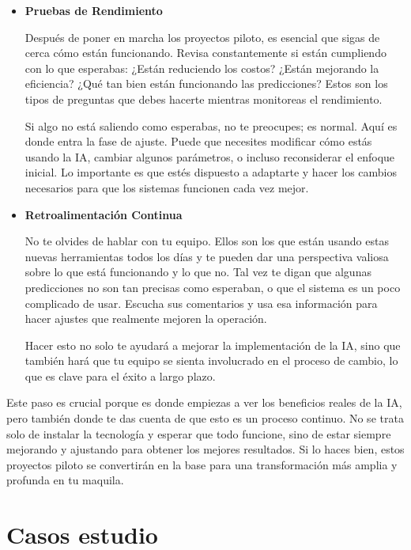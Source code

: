 \documentclass[
  10pt,
  letterpaper,
]{book}
\begin{document}
\begin{itemize}
\item
  \textbf{Pruebas de Rendimiento}

  Después de poner en marcha los proyectos piloto, es esencial que sigas
  de cerca cómo están funcionando. Revisa constantemente si están
  cumpliendo con lo que esperabas: ¿Están reduciendo los costos? ¿Están
  mejorando la eficiencia? ¿Qué tan bien están funcionando las
  predicciones? Estos son los tipos de preguntas que debes hacerte
  mientras monitoreas el rendimiento.

  Si algo no está saliendo como esperabas, no te preocupes; es normal.
  Aquí es donde entra la fase de ajuste. Puede que necesites modificar
  cómo estás usando la IA, cambiar algunos parámetros, o incluso
  reconsiderar el enfoque inicial. Lo importante es que estés dispuesto
  a adaptarte y hacer los cambios necesarios para que los sistemas
  funcionen cada vez mejor.
\item
  \textbf{Retroalimentación Continua}

  No te olvides de hablar con tu equipo. Ellos son los que están usando
  estas nuevas herramientas todos los días y te pueden dar una
  perspectiva valiosa sobre lo que está funcionando y lo que no. Tal vez
  te digan que algunas predicciones no son tan precisas como esperaban,
  o que el sistema es un poco complicado de usar. Escucha sus
  comentarios y usa esa información para hacer ajustes que realmente
  mejoren la operación.

  Hacer esto no solo te ayudará a mejorar la implementación de la IA,
  sino que también hará que tu equipo se sienta involucrado en el
  proceso de cambio, lo que es clave para el éxito a largo plazo.
\end{itemize}

Este paso es crucial porque es donde empiezas a ver los beneficios
reales de la IA, pero también donde te das cuenta de que esto es un
proceso continuo. No se trata solo de instalar la tecnología y esperar
que todo funcione, sino de estar siempre mejorando y ajustando para
obtener los mejores resultados. Si lo haces bien, estos proyectos piloto
se convertirán en la base para una transformación más amplia y profunda
en tu maquila.


\chapter{Casos estudio}\label{casos-estudio}
\end{document}
